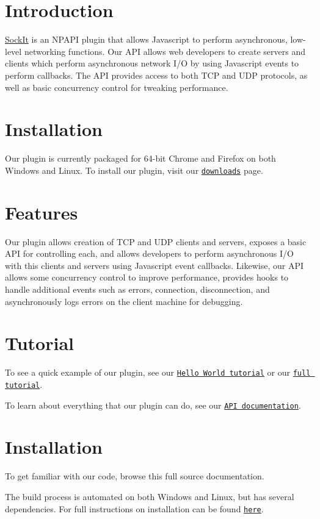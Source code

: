 \hypertarget{index_intro_sec}{}\section{Introduction}\label{index_intro_sec}
\hyperlink{classSockIt}{SockIt} is an NPAPI plugin that allows Javascript to perform asynchronous, low-\/level networking functions. Our API allows web developers to create servers and clients which perform asynchronous network I/O by using Javascript events to perform callbacks. The API provides access to both TCP and UDP protocols, as well as basic concurrency control for tweaking performance.\hypertarget{index_install_sec}{}\section{Installation}\label{index_install_sec}
Our plugin is currently packaged for 64-\/bit Chrome and Firefox on both Windows and Linux. To install our plugin, visit our \href{http://sockit.github.com/sockit/downloads.html}{\tt downloads} page.\hypertarget{index_features_sec}{}\section{Features}\label{index_features_sec}
Our plugin allows creation of TCP and UDP clients and servers, exposes a basic API for controlling each, and allows developers to perform asynchronous I/O with this clients and servers using Javascript event callbacks. Likewise, our API allows some concurrency control to improve performance, provides hooks to handle additional events such as errors, connection, disconnection, and asynchronously logs errors on the client machine for debugging.\hypertarget{index_tutorial_sec}{}\section{Tutorial}\label{index_tutorial_sec}
To see a quick example of our plugin, see our \href{http://sockit.github.com/sockit/tutorial.html}{\tt Hello World tutorial} or our \href{http://sockit.github.com/sockit/tutorial/full_tutorial.html}{\tt full tutorial}. 

To learn about everything that our plugin can do, see our \href{http://sockit.github.com/sockit/api_documentation.html}{\tt API documentation}.\hypertarget{index_install_sec}{}\section{Installation}\label{index_install_sec}
To get familiar with our code, browse this full source documentation. 

The build process is automated on both Windows and Linux, but has several dependencies. For full instructions on installation can be found \href{../index.html}{\tt here}.  